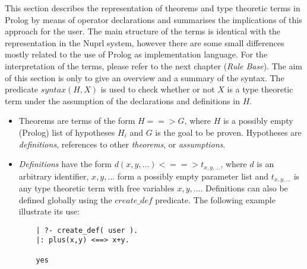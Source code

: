 \documentclass[11pt]{report}
\makeatletter
\newcommand{\ulinv}[1]{\index{#1@\texttt{#1}}}
\makeatother
\begin{document}
 This section describes the representation of theorems and 
 type theoretic terms in Prolog by means
 of operator declarations and summarises the implications of
 this approach for the user. The main structure of the terms
 is identical with the representation in the Nuprl system,
 however there are some small differences mostly related to
 the use of Prolog as implementation language. For the interpretation
 of the terms, please refer to the next chapter (\emph{Rule Base}).
 The aim of this section is only to give an overview and a
 summary of the syntax.  The predicate $syntax(H,X)$ is used
 to check whether or not $X$ is a type theoretic term under the
 assumption of the declarations and definitions in $H$.
 \begin{itemize}
 \item
 Theorems are terms of the form $H ==> G$,
 where $H$ is a possibly empty
 (Prolog) list of hypotheses $H_{i}$ and  $G$ is the goal to be proven.
 Hypotheses are \emph{definitions}, references to other \emph{theorems},
 or \emph{assumptions}.
 \item
 \emph{Definitions} have the form $d(x,y,...) <==> t_{x,y,...}$,
 where $d$ is an arbitrary identifier,  $x,y,...$ form a
 possibly empty parameter list and $t_{x,y,...}$ is any type
 theoretic term with free variables $x,y,...$.
 Definitions can also be defined globally using the $create\_def$ 
 \ulinv{create\_def} predicate.   The following example illustrate
 its use:
 \begin{small}\begin{verbatim}
    | ?- create_def( user ).
    |: plus(x,y) <==> x+y.
 
    yes
 \end{verbatim}\end{small}
 

\end{itemize}
\end{document}
